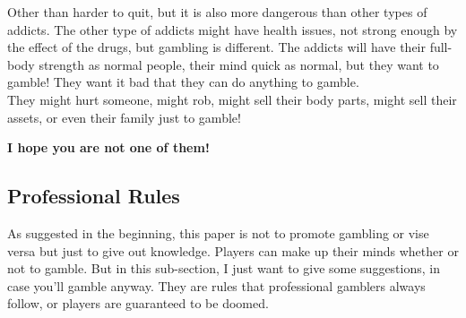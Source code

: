 \documentclass{article}
\begin{document}
Other than harder to quit, but it is also more dangerous than other types of addicts.  The other type of addicts might have health issues, not strong enough by the effect of the drugs, but gambling is different.  The addicts will have their full-body strength as normal people, their mind quick as normal, but they want to gamble!  They want it bad that they can do anything to gamble. \\

They might hurt someone, might rob, might sell their body parts, might sell their assets, or even their family just to gamble!\\
\begin{center}
\textbf{I hope you are not one of them!}
\end{center}

\subsection{Professional Rules}
As suggested in the beginning, this paper is not to promote gambling or vise versa but just to give out knowledge. Players can make up their minds whether or not to gamble.  But in this sub-section, I just want to give some suggestions, in case you'll gamble anyway.  They are rules that professional gamblers always follow, or players are guaranteed to be doomed. 
\end{document}
